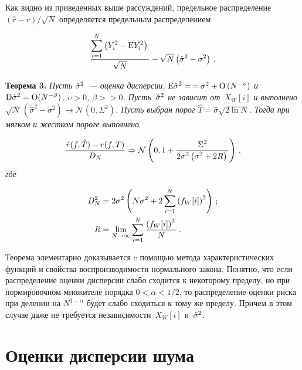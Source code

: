 \begin{multicols}{2}
Как видно из приведенных выше рассуждений, предельное распределение 
$\left(\hat r-r\right)/\sqrt N$ определяется предельным распределением

\noindent
\begin{equation*}
\displaystyle\frac{\displaystyle \sum\limits_{i=1}^{N}\left(Y_i^2-\textrm{E} Y_i^2\right)\mathstrut}{\displaystyle \sqrt{N}\mathstrut}-\sqrt{N}\left(\hat\sigma^2-\sigma^2\right)\,.
\end{equation*}

\vspace*{-2pt}

\noindent %
\textbf{Теорема 3.} \textit{Пусть $\hat\sigma^2$~--- оценка дисперсии, 
$\textrm{E}\hat\sigma^2=$\linebreak $=\sigma^2+\textrm{O}\left(N^{-\upsilon}\right)$ и 
$\textrm{D}\hat\sigma^2=\textrm{O}(N^{-\beta})$, $\upsilon>0$, $\beta>$\linebreak $>0$. 
Пусть~$\hat\sigma^2$ не зависит от~$X_W[i]$ и выполнено
$\sqrt{\mathcal{N}}\left ( \hat{\sigma}^2-\sigma^2\right )\rightarrow \mathcal{N}\left (0,\Sigma^2\right)$.
Пусть выбран порог $\hat T=\hat\sigma\sqrt{2\ln N}$. Тогда при мягком и жестком пороге выполнено}
\vspace*{3pt}

\noindent
\begin{equation*}
\displaystyle\frac{\displaystyle \hat{r}(f,\hat{T})-r(f,T)\mathstrut}{\displaystyle D_N\mathstrut}\Rightarrow \mathcal{N}\left(0,1+\displaystyle\frac{\displaystyle \Sigma^2\mathstrut}{\displaystyle 2\sigma^2\left(\sigma^2+2R\right)\mathstrut}\right)\,,
\end{equation*}
\textit{где}

\noindent
\begin{align*}
D_N^2 &= 2\sigma^2\left(N\sigma^2+2\sum_{i=1}^N \left(f_W[i]\right)^2\right)\,;\\
R &= \lim\limits_{N\rightarrow\infty}\sum\limits_{i=1}^N\displaystyle\frac{\displaystyle \left(f_W[i]\right)^2\mathstrut}{\displaystyle N\mathstrut}\,.
\end{align*}


\noindent
Теорема элементарно доказывается c помощью метода характеристических функций и свойства 
воспроизводимости нормального закона. Понятно, что если распределение оценки дисперсии слабо 
сходится к некоторому пределу, но при нормировочном множителе порядка $0<\alpha<1/2$, то 
распределение оценки риска при делении на $N^{1-\alpha}$ будет слабо сходиться к 
тому же пределу. Причем в этом случае даже не требуется независимости~$X_W[i]$ и~$\hat\sigma^2$.

\section{Оценки дисперсии шума}


\end{multicols}
